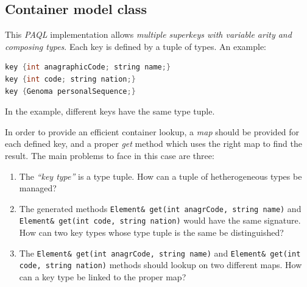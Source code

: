 \documentclass[10pt]{article}  %
\begin{document}
    \subsection{Container model class}
        This \emph{PAQL} implementation allows \emph{multiple superkeys with variable arity and composing types}.
        Each key is defined by a tuple of types. An example:
        \begin{lstlisting}[language=C++]
key {int anagraphicCode; string name;}
key {int code; string nation;}
key {Genoma personalSequence;}
        \end{lstlisting}
        In the example, different keys have the same type tuple.

        In order to provide an efficient container lookup, a \emph{map} should be provided
        for each defined key, and a proper \emph{get} method which uses the right map to find the result.
        The main problems to face in this case are three:
        \begin{enumerate}
            \item The \emph{``key type''} is a type tuple. How can a tuple of hetherogeneous types be managed?
            \item The generated methods \texttt{Element\& get(int anagrCode, string name)} and \texttt{Element\& get(int code, string nation)}
                would have the same signature. How can two key types whose type tuple is the same be distinguished?
            \item The \texttt{Element\& get(int anagrCode, string name)} and \texttt{Element\& get(int code, string nation)} methods should
            lookup on two different maps. How can a key type be linked to the proper map?
        \end{enumerate}
\end{document}

